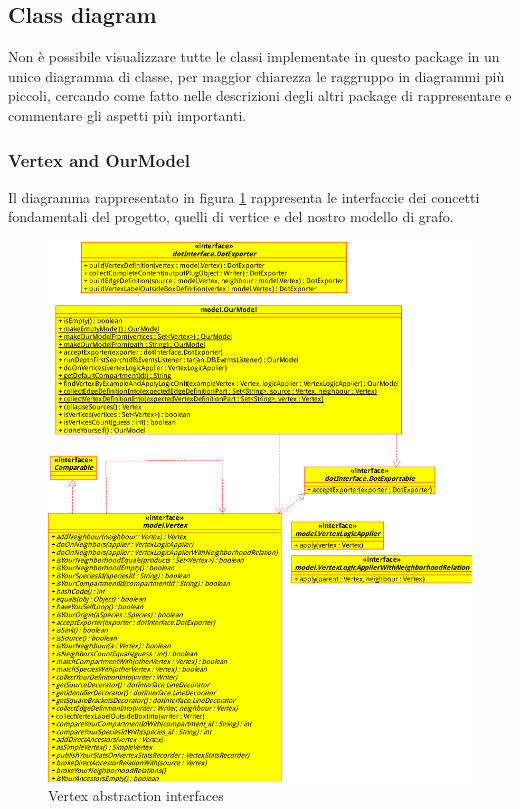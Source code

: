 \subsection{Class diagram}

Non \`e possibile visualizzare tutte le classi implementate in questo
package in un unico diagramma di classe, per maggior chiarezza le
raggruppo in diagrammi pi\`u piccoli, cercando come fatto nelle
descrizioni degli altri package di rappresentare e commentare gli
aspetti pi\`u importanti.

\subsubsection{Vertex and OurModel}
Il diagramma rappresentato in figura
\ref{fig:vertex-abstraction-interfaces} rappresenta le interfaccie
dei concetti fondamentali del progetto, quelli di vertice e del nostro
modello di grafo.

\begin{figure}
  \centering
  \includegraphics{packages/vertex-interface-class-diagram.eps}
  \caption{Vertex abstraction interfaces}
  \label{fig:vertex-abstraction-interfaces}
\end{figure}

